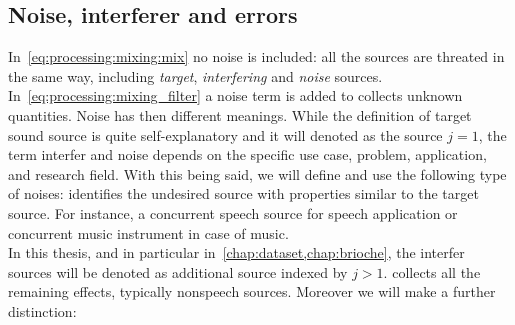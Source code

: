 \subsection{Noise, interferer and errors}
In~\cref{eq:processing:mixing:mix} no noise is included:
all the sources are threated in the same way, including \textit{target}, \textit{interfering} and \textit{noise} sources.
In~\cref{eq:processing:mixing_filter} a noise term is added to collects unknown quantities.
Noise has then different meanings.
While the definition of target sound source is quite self-explanatory and it will denoted as the source $j = 1$,
the term interfer and noise depends on the specific use case, problem, application, and research field.
With this being said, we will define and use the following type of noises:
 identifies the undesired source with properties similar to the target source.
For instance, a concurrent speech source for speech application or concurrent music instrument in case of music.
\\In this thesis, and in particular in~\cref{chap:dataset,chap:brioche}, the interfer sources will be denoted
as additional source indexed by $j > 1$.
 collects all the remaining effects, typically nonspeech sources. Moreover we will make a further distinction:

